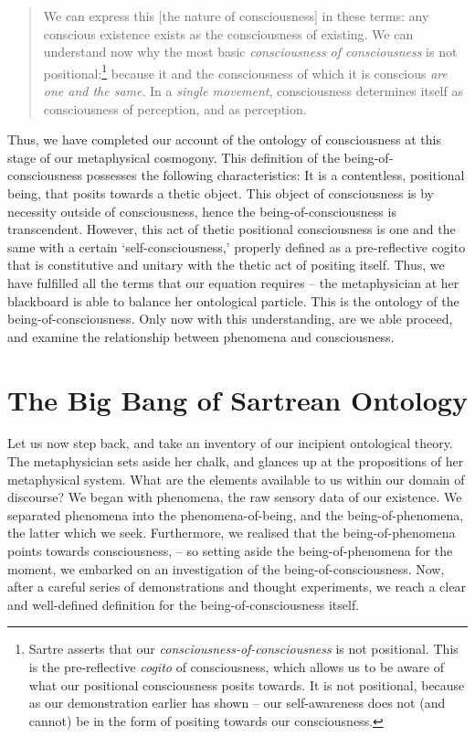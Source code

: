 \blockcquote[12]{Sartre}{%
    We can express this [the nature of consciousness] in these terms: any conscious existence exists as the consciousness of existing. We can understand now why the most basic \emph{consciousness of consciousness} is not positional:\footnote{Sartre asserts that our \emph{consciousness-of-consciousness} is not positional. This is the pre-reflective \emph{cogito} of consciousness, which allows us to be aware of what our positional consciousness posits towards. It is not positional, because as our demonstration earlier has shown -- our self-awareness does not (and cannot) be in the form of positing towards our consciousness.} because it and the consciousness of which it is conscious \emph{are one and the same}. In a \emph{single movement}, consciousness determines itself as consciousness of perception, and as perception.
}

\noindent
Thus, we have completed our account of the ontology of consciousness at this stage of our metaphysical cosmogony. This definition of the being-of-consciousness possesses the following characteristics: It is a contentless, positional being, that posits towards a thetic object. This object of consciousness is by necessity outside of consciousness, hence the being-of-consciousness is transcendent. However, this act of thetic positional consciousness is one and the same with a certain \enquote*{self-consciousness,} properly defined as a pre-reflective cogito that is constitutive and unitary with the thetic act of positing itself. Thus, we have fulfilled all the terms that our equation requires -- the metaphysician at her blackboard is able to balance her ontological particle. This is the ontology of the being-of-consciousness. Only now with this understanding, are we able proceed, and examine the relationship between phenomena and consciousness.


\section{The Big Bang of Sartrean Ontology}


Let us now step back, and take an inventory of our incipient ontological theory. The metaphysician sets aside her chalk, and glances up at the propositions of her metaphysical system. What are the elements available to us within our domain of discourse? We began with phenomena, the raw sensory data of our existence. We separated phenomena into the phenomena-of-being, and the being-of-phenomena, the latter which we seek. Furthermore, we realised that the being-of-phenomena points towards consciousness, -- so setting aside the being-of-phenomena for the moment, we embarked on an investigation of the being-of-consciousness. Now, after a careful series of demonstrations and thought experiments, we reach a clear and well-defined definition for the being-of-consciousness itself. 

